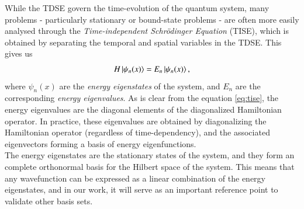 \documentclass{subfiles}
\begin{document}
While the TDSE govern the time-evolution of the quantum system, many problems - particularly stationary or bound-state problems - are often more easily analysed through the \emph{Time-independent Schrödinger Equation} (TISE), which is obtained by separating the temporal and spatial variables in the TDSE. This gives us
\begin{equation}
    H\ket{\psi_n(x)} = E_n\ket{\psi_n(x)}\label{eq:tise},
\end{equation}
where $\psi_n(x)$ are the \emph{energy eigenstates} of the system, and $E_n$ are the corresponding \emph{energy eigenvalues}. As is clear from the equation \eqref{eq:tise}, the energy eigenvalues are the diagonal elements of the diagonalized Hamiltonian operator. In practice, these eigenvalues are obtained by diagonalizing the Hamiltonian operator (regardless of time-dependency), and the associated eigenvectors forming a basis of energy eigenfunctions. \\

The energy eigenstates are the stationary states of the system, and they form an complete orthonormal basis for the Hilbert space of the system. This means that any wavefunction can be expressed as a linear combination of the energy eigenstates, and in our work, it will serve as an important reference point to validate other basis sets. 

\end{document}
